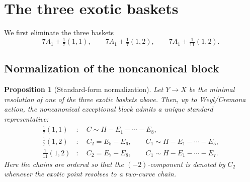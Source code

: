 \documentclass[11pt]{article}
\newtheorem{proposition}[theorem]{Proposition}
\theoremstyle{definition}
\begin{document}
\section{The three exotic baskets}\label{sec:exotic}
We first eliminate the three baskets
\[
7A_1+\tfrac17(1,1),\qquad 7A_1+\tfrac17(1,2),\qquad 7A_1+\tfrac1{11}(1,2).
\]

\subsection{Normalization of the noncanonical block}

\begin{proposition}[Standard-form normalization]\label{prop:exotic-normalization}
Let $Y\to X$ be the minimal resolution of one of the three exotic baskets above. Then, up to Weyl/Cremona action, the noncanonical exceptional block admits a unique standard representative:
\begin{align*}
\tfrac17(1,1) &:\quad C\sim H-E_1-\cdots-E_8,\\
\tfrac17(1,2) &:\quad C_2=E_5-E_6,\qquad C_1\sim H-E_1-\cdots-E_5,\\
\tfrac1{11}(1,2) &:\quad C_2=E_7-E_8,\qquad C_1\sim H-E_1-\cdots-E_7.
\end{align*}
Here the chains are ordered so that the $(-2)$-component is denoted by $C_2$ whenever the exotic point resolves to a two-curve chain.
\end{proposition}
\end{document}
